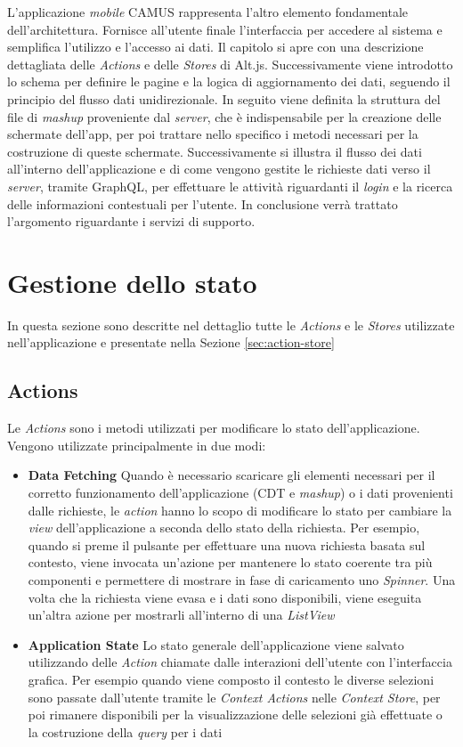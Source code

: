 L'applicazione \emph{mobile} CAMUS rappresenta l'altro elemento fondamentale dell'ar\-chi\-tet\-tu\-ra. Fornisce all'utente finale l'interfaccia per accedere al sistema e semplifica l'utilizzo e l'accesso ai dati. Il capitolo si apre con una descrizione dettagliata delle \emph{Actions} e delle \emph{Stores} di Alt.js.
%
Successivamente viene introdotto lo schema per definire le pagine e la logica di aggiornamento dei dati, seguendo il principio del flusso dati unidirezionale. In seguito viene definita la struttura del file di \emph{mashup} proveniente dal \emph{server}, che è indispensabile per la creazione delle schermate dell'app, per poi trattare nello specifico i metodi necessari per la costruzione di queste schermate.
Successivamente si illustra il flusso dei dati all'interno dell'applicazione e di come vengono gestite le richieste dati verso il \emph{server}, tramite GraphQL, per effettuare le attività riguardanti il \emph{login} e la ricerca delle informazioni contestuali per l'utente. In conclusione verrà trattato l'argomento riguardante i servizi di supporto.

\section{Gestione dello stato}\label{sec:state-management}
In questa sezione sono descritte nel dettaglio tutte le \emph{Actions} e le \emph{Stores} utilizzate nell'applicazione e presentate nella Sezione \ref{sec:action-store}

\subsection{Actions\label{sec:actions}}

Le \emph{Actions} sono i metodi utilizzati per modificare lo stato dell'ap\-pli\-ca\-zio\-ne. Vengono utilizzate principalmente in due modi:

\begin{itemize}
	\item \textbf{Data Fetching}
	Quando è necessario scaricare gli elementi necessari per il corretto funzionamento dell'applicazione (CDT e \emph{mashup}) o i dati provenienti dalle richieste, le \emph{action} hanno lo scopo di modificare lo stato per cambiare la \emph{view} dell'applicazione a seconda dello stato della richiesta.
	Per esempio, quando si preme il pulsante per effettuare una nuova richiesta basata sul contesto, viene invocata un'azione per mantenere lo stato coerente tra più componenti e permettere di mostrare in fase di caricamento uno \emph{Spinner}. Una volta che la richiesta viene evasa e i dati sono disponibili, viene eseguita un’altra azione per mostrarli all’interno di una \emph{ListView}
	\item \textbf{Application State}
	Lo stato generale dell'applicazione viene salvato utilizzando delle \emph{Action} chiamate dalle interazioni dell'utente con l'interfaccia grafica. Per esempio quando viene composto il contesto le diverse selezioni sono passate dall'utente tramite le \emph{Context Actions} nelle \emph{Context Store}, per poi rimanere disponibili per la visualizzazione delle selezioni già effettuate o la costruzione della \emph{query} per i dati
\end{itemize}	

